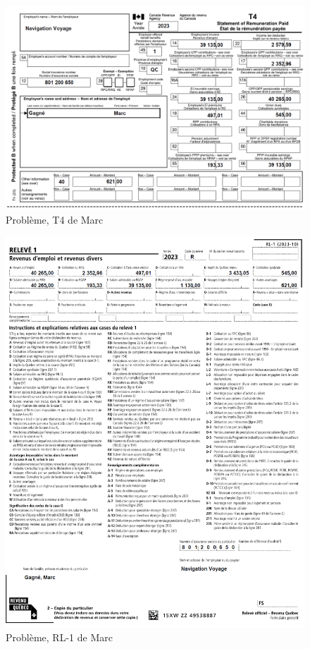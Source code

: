 \begin{figure}
	\centering
	\includegraphics[width=.9\textwidth]{probleme/chapitre-6/Marc-T4.png}
	\caption[]{Problème, T4 de Marc}
	\label{fig:chap6ProblemeMarcT4}
\end{figure}
\begin{figure}
	\centering
	\includegraphics[width=.9\textwidth]{probleme/chapitre-6/Marc-RL1.png}
	\caption[]{Problème, RL-1 de Marc}
	\label{fig:chap6ProblemeMarcRL1}
\end{figure}
